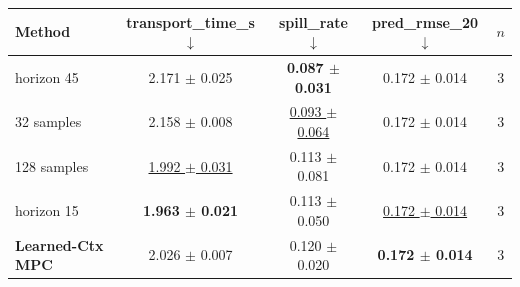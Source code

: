 \begin{tabular}{lcccc}
\toprule
Method & transport\_time\_s $\downarrow$ & spill\_rate $\downarrow$ & pred\_rmse\_20 $\downarrow$ & $n$ \\
\midrule
horizon 45 & 2.171 $\pm$ 0.025 & \textbf{0.087 $\pm$ 0.031} & 0.172 $\pm$ 0.014 & 3 \\
32 samples & 2.158 $\pm$ 0.008 & \underline{0.093 $\pm$ 0.064} & 0.172 $\pm$ 0.014 & 3 \\
128 samples & \underline{1.992 $\pm$ 0.031} & 0.113 $\pm$ 0.081 & 0.172 $\pm$ 0.014 & 3 \\
horizon 15 & \textbf{1.963 $\pm$ 0.021} & 0.113 $\pm$ 0.050 & \underline{0.172 $\pm$ 0.014} & 3 \\
\textbf{Learned-Ctx MPC} & 2.026 $\pm$ 0.007 & 0.120 $\pm$ 0.020 & \textbf{0.172 $\pm$ 0.014} & 3 \\
\bottomrule
\end{tabular}
